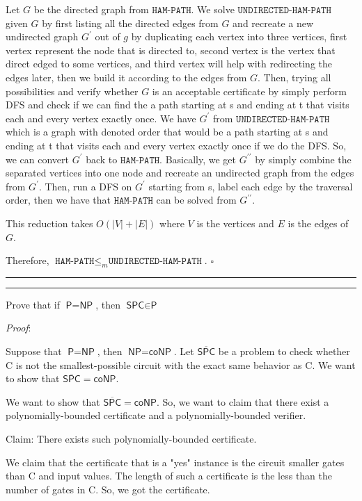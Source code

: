 \documentclass[a4paper, 11pt]{article}
\newcommand{\question}[2] {\vspace{.25in} \hrule\vspace{0.5em}
	\noindent{\bf #1: #2} \vspace{0.5em}
	\hrule \vspace{.10in}}
\begin{document}
	Let $G$ be the directed graph from $\texttt{HAM-PATH}$. We solve $\texttt{UNDIRECTED-HAM-PATH}$ given $G$ by first listing all the directed edges from $G$ and recreate a new undirected graph $G^\prime$ out of $g$ by duplicating each vertex into three vertices, first vertex represent the node that is directed to, second vertex is the vertex that direct edged to some vertices, and third vertex will help with redirecting the edges later, then we build it according to the edges from $G$. Then, trying all possibilities and verify whether $G$ is an acceptable certificate by simply perform DFS and check if we can find the a path starting at s and ending at t that visits each and every vertex exactly once. We have $G^\prime$ from $\texttt{UNDIRECTED-HAM-PATH}$ which is a graph with denoted order that would be a path starting at s and ending at t that visits each and every vertex exactly once if we do the DFS. So, we can convert $G^\prime$ back to $\texttt{HAM-PATH}$. Basically, we get $G^{\prime \prime}$ by simply combine the separated vertices into one node and recreate an undirected graph from the edges from $G^\prime$. Then, run a DFS on $G^\prime$ starting from s, label each edge by the traversal order, then we have that $\texttt{HAM-PATH}$ can be solved from $G^{\prime \prime}$.
	
	This reduction takes $O(|V|+|E|)$ where $V$ is the vertices and $E$ is the edges of $G$.
	
	Therefore, $\texttt{HAM-PATH} \leq_m \texttt{UNDIRECTED-HAM-PATH}$. $\square$
	
	\question{5}{Silver Lining If P = NP}
	
	Prove that if $\textsf{P} = \textsf{NP}$, then $\textsf{SPC} \in \textsf{P}$
	
	{\em Proof}: 
	
	Suppose that $\textsf{P} = \textsf{NP}$, then $\textsf{NP} = \textsf{coNP}$. Let $\overline{\textsf{SPC}}$ be a problem to check whether C is not the smallest-possible circuit with the exact same behavior as C. We want to show that $\overline{\textsf{SPC}}= \textsf{coNP}$.
	
	We want to show that $\overline{\textsf{SPC}}= \textsf{coNP}$. So, we want to claim that there exist a polynomially-bounded certificate and a polynomially-bounded verifier.
	
	Claim: There exists such polynomially-bounded certificate.
	
	We claim that the certificate that is a "yes" instance is the circuit smaller gates than C and input values. The length of such a certificate is the less than the number of gates in C. So, we got the certificate.
	
\end{document}

